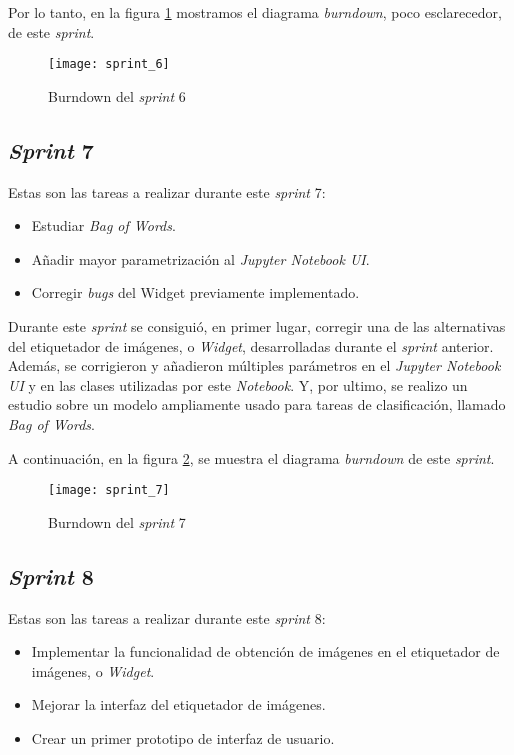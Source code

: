 Por lo tanto, en la figura \ref{fig:A.1.7} mostramos el diagrama \textit{burndown}, poco esclarecedor, de este \textit{sprint}.

\begin{figure}
\centering
\texttt{[image: sprint\_6]}
\caption{Burndown del \textit{sprint} 6}
\label{fig:A.1.7}
\end{figure}



\subsection{\textit{Sprint} 7}
Estas son las tareas a realizar durante este \textit{sprint} 7:

\begin{itemize}
	\item Estudiar \textit{Bag of Words}.
	\item Añadir mayor parametrización al \textit{Jupyter Notebook UI}.
	\item Corregir \textit{bugs} del Widget previamente implementado.
\end{itemize}

Durante este \textit{sprint} se consiguió, en primer lugar, corregir una de las alternativas del etiquetador de imágenes, o \textit{Widget}, desarrolladas durante el \textit{sprint} anterior. Además, se corrigieron y añadieron múltiples parámetros en el \textit{Jupyter Notebook UI} y en las clases utilizadas por este \textit{Notebook}. Y, por ultimo, se realizo un estudio sobre un modelo ampliamente usado para tareas de clasificación, llamado \textit{Bag of Words}.

A continuación, en la figura \ref{fig:A.1.8}, se muestra el diagrama \textit{burndown} de este \textit{sprint}.

\begin{figure}
\centering
\texttt{[image: sprint\_7]}
\caption{Burndown del \textit{sprint} 7}
\label{fig:A.1.8}
\end{figure}


\subsection{\textit{Sprint} 8}
Estas son las tareas a realizar durante este \textit{sprint} 8:

\begin{itemize}
	\item Implementar la funcionalidad de obtención de imágenes en el etiquetador de imágenes, o \textit{Widget}.
	\item Mejorar la interfaz del etiquetador de imágenes.
	\item Crear un primer prototipo de interfaz de usuario.
\end{itemize}

